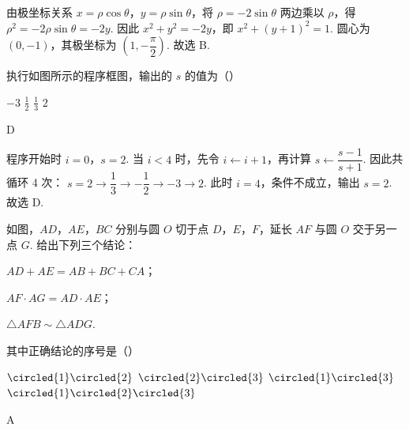 \begin{solution}
由极坐标关系 \(x=\rho\cos\theta\)，\(y=\rho\sin\theta\)，将 \(\rho=-2\sin\theta\) 两边乘以 \(\rho\)，得 \(\rho^2=-2\rho\sin\theta=-2y\). 因此 \(x^2+y^2=-2y\)，即 \(x^2+(y+1)^2=1\). 圆心为 \((0,-1)\)，其极坐标为 \(\left(1,-\dfrac{\pi}{2}\right)\). 故选 B.
\end{solution}

\begin{problem}
执行如图所示的程序框图，输出的 \(s\) 的值为（\quad）


\choices
    {\(-3\)}
    {\(\frac{1}{2}\)}
    {\(\frac{1}{3}\)}
    {\(2\)}
\end{problem}

\begin{answer}
D
\end{answer}

\begin{solution}
程序开始时 \(i=0\)，\(s=2\). 当 \(i<4\) 时，先令 \(i\leftarrow i+1\)，再计算 \(s\leftarrow\dfrac{s-1}{s+1}\). 因此共循环 4 次：
\(s=2\to\dfrac13\to-\dfrac12\to-3\to2\). 此时 \(i=4\)，条件不成立，输出 \(s=2\). 故选 D.
\end{solution}

\begin{problem}
如图，\(AD\)，\(AE\)，\(BC\) 分别与圆 \(O\) 切于点 \(D\)，\(E\)，\(F\)，延长 \(AF\) 与圆 \(O\) 交于另一点 \(G\). 给出下列三个结论：

\begin{circlelist}
\item \(AD + AE = AB + BC + CA\)；
\item \(AF \cdot AG = AD \cdot AE\)；
\item \(\triangle AFB \sim \triangle ADG\).
\end{circlelist}

其中正确结论的序号是（\quad）


\choices
    {\(\circled{1}\circled{2}\)}
    {\(\circled{2}\circled{3}\)}
    {\(\circled{1}\circled{3}\)}
    {\(\circled{1}\circled{2}\circled{3}\)}
\end{problem}

\begin{answer}
A
\end{answer}

